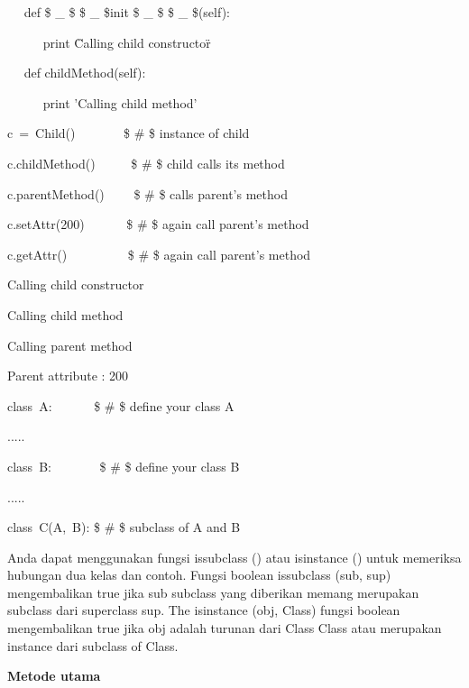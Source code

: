 \begin{12pt}
\begin{12pt}
\begin{12pt}
\begin{12pt}
\begin{12pt}
\begin{12pt}
\begin{12pt}
\begin{12pt}
\begin{12pt}
\begin{12pt}
\begin{12pt}
\begin{12pt}
\begin{12pt}
\begin{12pt}
\begin{12pt}
\begin{12pt}
\begin{12pt}
\begin{12pt}
\begin{12pt}
\noindent 
~~ def  \$  \_  \$ \$  \_  \$init \$  \_  \$ \$  \_  \$(self): \par
\noindent 
~~~~~ print \"Calling child constructor\" \par
\vspace{12pt}
\noindent 
~~ def childMethod(self): \par
\noindent 
~~~~~ print 'Calling child method' \par
\vspace{12pt}
\noindent 
c~=~Child()~~~~~~~    \$  \#  \$ instance of child \par
\noindent 
c.childMethod()~~~~~  \$  \#  \$ child calls its method \par
\noindent 
c.parentMethod()~~~~  \$  \#  \$ calls parent's method \par
\noindent 
c.setAttr(200)~~~~~~  \$  \#  \$ again call parent's method \par
\noindent 
c.getAttr()~~~~~~~~~  \$  \#  \$ again call parent's method \par
\vspace{12pt}
\noindent 
Calling child constructor \par
\noindent 
Calling child method \par
\noindent 
Calling parent method \par
\noindent 
Parent attribute : 200 \par
\vspace{12pt}
\noindent 
class~A:~~~~~~   \$  \#  \$ define your class A \par
\noindent 
..... \par
\vspace{12pt}
\noindent 
class~B:~~~~~~~   \$  \#  \$ define your class B \par
\noindent 
..... \par
\vspace{12pt}
\noindent 
class~C(A,~B):    \$  \#  \$ subclass of A and B \par
\vspace{12pt}
Anda dapat menggunakan fungsi issubclass () atau isinstance () untuk memeriksa hubungan dua kelas dan contoh. Fungsi boolean issubclass (sub, sup) mengembalikan true jika sub subclass yang diberikan memang merupakan subclass dari superclass sup. The isinstance (obj, Class) fungsi boolean mengembalikan true jika obj adalah turunan dari Class Class atau merupakan instance dari subclass of Class. \par
\vspace{12pt}
\noindent 
{\fontsize{14pt}{14pt}\selectfont \textbf{Metode utama} \\} \par

\end{12pt}
\end{12pt}
\end{12pt}
\end{12pt}
\end{12pt}
\end{12pt}
\end{12pt}
\end{12pt}
\end{12pt}
\end{12pt}
\end{12pt}
\end{12pt}
\end{12pt}
\end{12pt}
\end{12pt}
\end{12pt}
\end{12pt}
\end{12pt}
\end{12pt}
